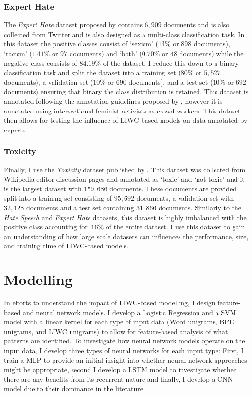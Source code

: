 \subsubsection{Expert Hate}
The \textit{Expert Hate} dataset proposed by \citet{Waseem:2016} contains $6,909$ documents and is also collected from Twitter and is also designed as a multi-class classification task. In this dataset the positive classes consist of `sexism' ($13\%$ or $898$ documents), `racism' ($1.41\%$ or $97$ documents) and `both' ($0.70\%$ or $48$ documents) while the negative class consists of $84.19\%$ of the dataset. I reduce this down to a binary classification task and split the dataset into a training set ($80\%$ or $5,527$ documents), a validation set ($10\%$ or $690$ documents), and a test set ($10\%$ or $692$ documents) ensuring that binary the class distribution is retained. This dataset is annotated following the annotation guidelines proposed by \citet{Waseem-Hovy:2016}, however it is annotated using intersectional feminist activists as crowd-workers. This dataset then allows for testing the influence of LIWC-based models on data annotated by experts.

\subsubsection{Toxicity}
Finally, I use the \textit{Toxicity} dataset published by \citet{Wulczyn:2017}. This dataset was collected from Wikipedia editor discussion pages and annotated as `toxic' and `not-toxic' and it is the largest dataset with $159,686$ documents. These documents are provided split into a training set consisting of $95,692$ documents, a validation set with $32,128$ documents and a test set containing $31,866$ documents. Similarly to the \textit{Hate Speech} and \textit{Expert Hate} datasets, this dataset is highly imbalanced with the positive class accounting for $~16\%$ of the entire dataset. I use this dataset to gain an understanding of how large scale datasets can influences the performance, size, and training time of LIWC-based models.

\section{Modelling}

In efforts to understand the impact of LIWC-based modelling, I design feature-based and neural network models. I develop a Logistic Regression and a SVM model with a linear kernel for each type of input data (Word unigrams, BPE unigrams, and LIWC unigrams) to allow for feature-based analysis of what patterns are identified. To investigate how neural network models operate on the input data, I develop three types of neural networks for each input type: First, I train a MLP to provide an initial insight into whether neural network approaches might be appropriate, second I develop a LSTM model to investigate whether there are any benefits from its recurrent nature and finally, I develop a CNN model due to their dominance in the literature.\vspace{5mm}

